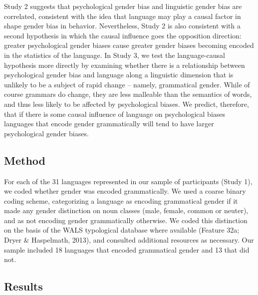 \documentclass[10pt, letterpaper]{article}
\begin{document}
Study 2 suggests that psychological gender bias and linguistic gender
bias are correlated, consistent with the idea that language may play a
causal factor in shape gender bias in behavior. Nevertheless, Study 2 is
also consistent with a second hypothesis in which the causal influence
goes the opposition direction: greater psychological gender biases cause
greater gender biases becoming encoded in the statistics of the
language. In Study 3, we test the language-causal hypothesis more
directly by examining whether there is a relationship between
psychological gender bias and language along a linguistic dimension that
is unlikely to be a subject of rapid change -- namely, grammatical
gender. While of course grammars do change, they are less malleable than
the semantics of words, and thus less likely to be affected by
psychological biases. We predict, therefore, that if there is some
causal influence of language on psychological biases languages that
encode gender grammatically will tend to have larger psychological
gender biases.

\subsection{Method}\label{method-3}

For each of the 31 languages represented in our sample of participants
(Study 1), we coded whether gender was encoded grammatically. We used a
coarse binary coding scheme, categorizing a language as encoding
grammatical gender if it made any gender distinction on noun classes
(male, female, common or neuter), and as not encoding gender
grammatically otherwise. We coded this distinction on the basis of the
WALS typological database where available (Feature 32a; Dryer \&
Haspelmath, 2013), and consulted additional resources as necessary. Our
sample included 18 languages that encoded grammatical gender and 13 that
did not.

\subsection{Results}\label{results-3}
\end{document}

